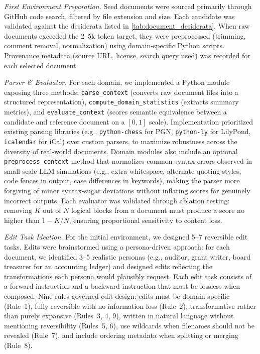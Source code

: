 \documentclass{article} %
\begin{document}
\textit{First Environment Preparation.} Seed documents were sourced primarily through GitHub code search, filtered by file extension and size. Each candidate was validated against the desiderata listed in \autoref{tab:document_desiderata}. When raw documents exceeded the 2--5k token target, they were preprocessed (trimming, comment removal, normalization) using domain-specific Python scripts. Provenance metadata (source URL, license, search query used) was recorded for each selected document.

\textit{Parser \& Evaluator.} For each domain, we implemented a Python module exposing three methods: \texttt{parse\_context} (converts raw document files into a structured representation), \texttt{compute\_domain\_statistics} (extracts summary metrics), and \texttt{evaluate\_context} (scores semantic equivalence between a candidate and reference document on a $[0, 1]$ scale). Implementation prioritized existing parsing libraries (e.g., \texttt{python-chess} for PGN, \texttt{python-ly} for LilyPond, \texttt{icalendar} for iCal) over custom parsers, to maximize robustness across the diversity of real-world documents. Domain modules also include an optional \texttt{preprocess\_context} method that normalizes common syntax errors observed in small-scale LLM simulations (e.g., extra whitespace, alternate quoting styles, code fences in output, case differences in keywords), making the parser more forgiving of minor syntax-sugar deviations without inflating scores for genuinely incorrect outputs. Each evaluator was validated through ablation testing: removing $K$ out of $N$ logical blocks from a document must produce a score no higher than $1 - K/N$, ensuring proportional sensitivity to content loss.

\textit{Edit Task Ideation.} For the initial environment, we designed 5--7 reversible edit tasks. Edits were brainstormed using a persona-driven approach: for each document, we identified 3--5 realistic personas (e.g., auditor, grant writer, board treasurer for an accounting ledger) and designed edits reflecting the transformations each persona would plausibly request. Each edit task consists of a forward instruction and a backward instruction that must be lossless when composed. Nine rules governed edit design: edits must be domain-specific (Rule~1), fully reversible with no information loss (Rule~2), transformative rather than purely expansive (Rules~3, 4, 9), written in natural language without mentioning reversibility (Rules~5, 6), use wildcards when filenames should not be revealed (Rule~7), and include ordering metadata when splitting or merging (Rule~8). 
\end{document}
